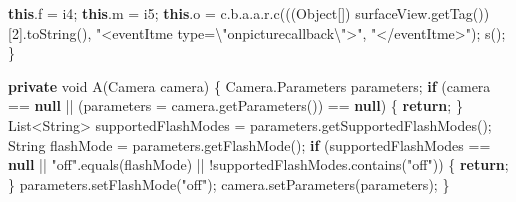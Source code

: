 \documentclass[
]{article}
\newenvironment{Shaded}{}{}
\newcommand{\BuiltInTok}[1]{\textcolor[rgb]{0.00,0.50,0.00}{#1}}
\newcommand{\ControlFlowTok}[1]{\textcolor[rgb]{0.00,0.44,0.13}{\textbf{#1}}}
\newcommand{\DataTypeTok}[1]{\textcolor[rgb]{0.56,0.13,0.00}{#1}}
\newcommand{\DecValTok}[1]{\textcolor[rgb]{0.25,0.63,0.44}{#1}}
\newcommand{\FunctionTok}[1]{\textcolor[rgb]{0.02,0.16,0.49}{#1}}
\newcommand{\KeywordTok}[1]{\textcolor[rgb]{0.00,0.44,0.13}{\textbf{#1}}}
\newcommand{\NormalTok}[1]{#1}
\newcommand{\OperatorTok}[1]{\textcolor[rgb]{0.40,0.40,0.40}{#1}}
\newcommand{\SpecialCharTok}[1]{\textcolor[rgb]{0.25,0.44,0.63}{#1}}
\newcommand{\StringTok}[1]{\textcolor[rgb]{0.25,0.44,0.63}{#1}}
\begin{document}
\begin{Shaded}
\begin{Highlighting}[]
        \KeywordTok{this}\OperatorTok{.}\FunctionTok{f} \OperatorTok{=}\NormalTok{ i4}\OperatorTok{;}
        \KeywordTok{this}\OperatorTok{.}\FunctionTok{m} \OperatorTok{=}\NormalTok{ i5}\OperatorTok{;}
        \KeywordTok{this}\OperatorTok{.}\FunctionTok{o} \OperatorTok{=}\NormalTok{ c}\OperatorTok{.}\FunctionTok{b}\OperatorTok{.}\FunctionTok{a}\OperatorTok{.}\FunctionTok{a}\OperatorTok{.}\FunctionTok{r}\OperatorTok{.}\FunctionTok{c}\OperatorTok{(((}\BuiltInTok{Object}\OperatorTok{[])}\NormalTok{ surfaceView}\OperatorTok{.}\FunctionTok{getTag}\OperatorTok{())[}\DecValTok{2}\OperatorTok{].}\FunctionTok{toString}\OperatorTok{(),} \StringTok{"\textless{}eventItme type=}\SpecialCharTok{\textbackslash{}"}\StringTok{onpicturecallback}\SpecialCharTok{\textbackslash{}"}\StringTok{\textgreater{}"}\OperatorTok{,} \StringTok{"\textless{}/eventItme\textgreater{}"}\OperatorTok{);}
        \FunctionTok{s}\OperatorTok{();}
    \OperatorTok{\}}

    \KeywordTok{private} \DataTypeTok{void} \FunctionTok{A}\OperatorTok{(}\NormalTok{Camera camera}\OperatorTok{)} \OperatorTok{\{}
\NormalTok{        Camera}\OperatorTok{.}\FunctionTok{Parameters}\NormalTok{ parameters}\OperatorTok{;}
        \ControlFlowTok{if} \OperatorTok{(}\NormalTok{camera }\OperatorTok{==} \KeywordTok{null} \OperatorTok{||} \OperatorTok{(}\NormalTok{parameters }\OperatorTok{=}\NormalTok{ camera}\OperatorTok{.}\FunctionTok{getParameters}\OperatorTok{())} \OperatorTok{==} \KeywordTok{null}\OperatorTok{)} \OperatorTok{\{}
            \ControlFlowTok{return}\OperatorTok{;}
        \OperatorTok{\}}
        \BuiltInTok{List}\OperatorTok{\textless{}}\BuiltInTok{String}\OperatorTok{\textgreater{}}\NormalTok{ supportedFlashModes }\OperatorTok{=}\NormalTok{ parameters}\OperatorTok{.}\FunctionTok{getSupportedFlashModes}\OperatorTok{();}
        \BuiltInTok{String}\NormalTok{ flashMode }\OperatorTok{=}\NormalTok{ parameters}\OperatorTok{.}\FunctionTok{getFlashMode}\OperatorTok{();}
        \ControlFlowTok{if} \OperatorTok{(}\NormalTok{supportedFlashModes }\OperatorTok{==} \KeywordTok{null} \OperatorTok{||} \StringTok{"off"}\OperatorTok{.}\FunctionTok{equals}\OperatorTok{(}\NormalTok{flashMode}\OperatorTok{)} \OperatorTok{||} \OperatorTok{!}\NormalTok{supportedFlashModes}\OperatorTok{.}\FunctionTok{contains}\OperatorTok{(}\StringTok{"off"}\OperatorTok{))} \OperatorTok{\{}
            \ControlFlowTok{return}\OperatorTok{;}
        \OperatorTok{\}}
\NormalTok{        parameters}\OperatorTok{.}\FunctionTok{setFlashMode}\OperatorTok{(}\StringTok{"off"}\OperatorTok{);}
\NormalTok{        camera}\OperatorTok{.}\FunctionTok{setParameters}\OperatorTok{(}\NormalTok{parameters}\OperatorTok{);}
    \OperatorTok{\}}


\end{Highlighting}
\end{Shaded}
\end{document}
